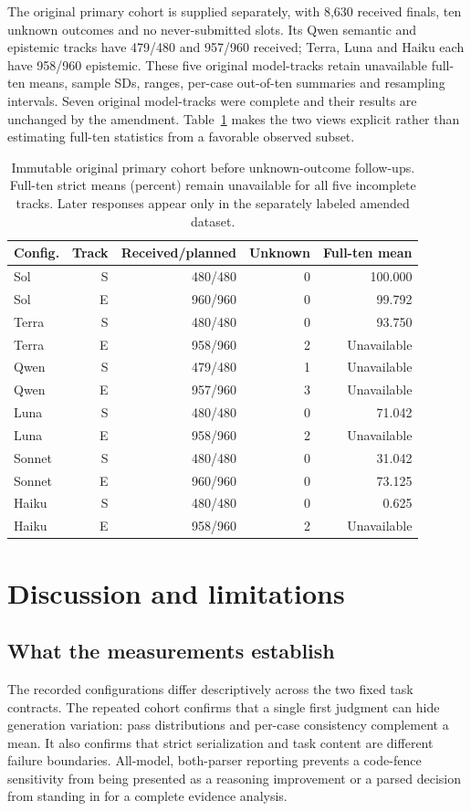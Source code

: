 \documentclass[a4paper,preprint,12pt,numbers,nopreprintline]{elsarticle}
\begin{document}
The original primary cohort is supplied separately, with 8,630 received finals, ten unknown outcomes and no never-submitted slots. Its Qwen semantic and epistemic tracks have 479/480 and 957/960 received; Terra, Luna and Haiku each have 958/960 epistemic. These five original model-tracks retain unavailable full-ten means, sample SDs, ranges, per-case out-of-ten summaries and resampling intervals. Seven original model-tracks were complete and their results are unchanged by the amendment. Table~\ref{tab:original-primary} makes the two views explicit rather than estimating full-ten statistics from a favorable observed subset.
\begin{table}[htbp]\centering\scriptsize
\caption{Immutable original primary cohort before unknown-outcome follow-ups. Full-ten strict means (percent) remain unavailable for all five incomplete tracks. Later responses appear only in the separately labeled amended dataset.}\label{tab:original-primary}
\setlength{\tabcolsep}{3pt}
\begin{tabular}{lrrrr}\toprule
Config. & Track & Received/planned & Unknown & Full-ten mean\\\midrule
Sol & S & 480/480 & 0 & 100.000\\
Sol & E & 960/960 & 0 & 99.792\\
Terra & S & 480/480 & 0 & 93.750\\
Terra & E & 958/960 & 2 & Unavailable\\
Qwen & S & 479/480 & 1 & Unavailable\\
Qwen & E & 957/960 & 3 & Unavailable\\
Luna & S & 480/480 & 0 & 71.042\\
Luna & E & 958/960 & 2 & Unavailable\\
Sonnet & S & 480/480 & 0 & 31.042\\
Sonnet & E & 960/960 & 0 & 73.125\\
Haiku & S & 480/480 & 0 & 0.625\\
Haiku & E & 958/960 & 2 & Unavailable\\
\bottomrule\end{tabular}
\end{table}

\section{Discussion and limitations}
\subsection{What the measurements establish}
The recorded configurations differ descriptively across the two fixed task contracts. The repeated cohort confirms that a single first judgment can hide generation variation: pass distributions and per-case consistency complement a mean. It also confirms that strict serialization and task content are different failure boundaries. All-model, both-parser reporting prevents a code-fence sensitivity from being presented as a reasoning improvement or a parsed decision from standing in for a complete evidence analysis.
\end{document}
